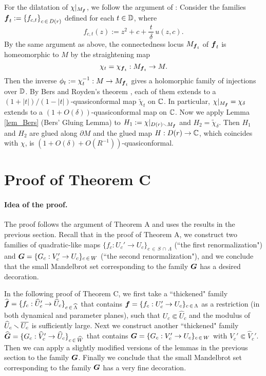 For the dilatation of $\chi|_{M_{\boldsymbol{f}}}$,
we follow the argument of \cite[Lemma 4.2]{McMullen 2000}:
Consider the families 
${\boldsymbol{f}}_t:={\left\{ f_{c,t} \right\}}_{c\, \in \,D(r)}$
defined for each $t \in \mathbb D$,
where
$$
f_{c,t}(z):=z^2+c+\frac{\,t\,}{\delta}\,u(z,c).
$$
By the same argument as above, 
the connectedness locus  $M_{{\boldsymbol{f}}_t}$ of ${\boldsymbol{f}}_t$
is homeomorphic to $M$ by the straightening map 
$$
\chi_t=\chi_{{\boldsymbol{f}}_t}:M_{{\boldsymbol{f}}_t} \to M.
$$
Then the inverse $\phi_t:=\chi_t^{-1}:M \to M_{{\boldsymbol{f}}_t}$
gives a holomorphic family of injections over $\mathbb D$.
By Bers and Royden's theorem \cite[Theorem 1]{Bers-Royden 1986},
each of them extends to a $(1+|t|)/(1-|t|)$-quasiconformal map 
$\widetilde{\chi}_t$ on $\mathbb C$.
In particular, $\chi|_{M_{\boldsymbol{f}}}=\chi_\delta$ extends 
to a $(1+O(\delta))$-quasiconformal map on $\mathbb C$.
Now we apply Lemma \ref{lem_Bers} (Bers' Gluing Lemma)
to $H_1:=\chi|_{D(r) \smallsetminus M_{\boldsymbol{f}}}$ and $H_2=\widetilde{\chi}_\delta$.
Then $H_1$ and $H_2$ are glued along $\partial M$
and the glued map $H:D(r)\to \mathbb C$, 
which coincides with $\chi$,
is $(1+O(\delta)+O(R^{-1}))$-quasiconformal.
\QED




\section{Proof of Theorem C}

\paragraph{\bf Idea of the proof.}
The proof follows the argument of Theorem A
and uses the results in the previous section.
Recall that in the proof of Theorem A,
 we construct two families of quadratic-like maps
$\{f_c: U_c' \to U_c\}_{c \, \in \, S \, \cap \,\Lambda}$ (``the first renormalization") 
and 
${\boldsymbol{G}}=\{G_c: V_c' \to U_c\}_{c \, \in \, W}$ (``the second renormalization"),
and we conclude that the small Mandelbrot set
corresponding to the family ${\boldsymbol{G}}$
has a desired decoration.
 
In the following proof of Theorem C, 
we first take a ``thickened" family 
$\widehat{\boldsymbol{f}}
=\{f_c: \widehat{U}_c' \to \widehat{U}_c\}_{c \, \in \, \widehat{\Lambda}}$ 
that contains 
${\boldsymbol{f}}=\{f_c: U_c' \to U_c\}_{c \, \in \, \Lambda}$
as a restriction (in both dynamical and parameter planes), 
such that $U_c \Subset \widehat{U}_c$ and 
the modulus of $\widehat{U}_c\smallsetminus\overline{U_c}$ 
is sufficiently large.
Next we construct another ``thickened" family 
$\widehat{\boldsymbol{G}}=\{G_c: \widehat{V}_c' \to \widehat{U}_c\}_{c \, \in \, \widehat{W}}$
that contains $\boldsymbol{G}=\{G_c: V_c' \to U_c\}_{c \, \in \, W}$
with $V_c' \Subset \widehat{V}_c'$.
Then we can apply a slightly modified versions of the lemmas 
in the previous section to the family $\boldsymbol{G}$.
Finally we conclude that the small Mandelbrot set
corresponding to the family ${\boldsymbol{G}}$
has a very fine decoration.

